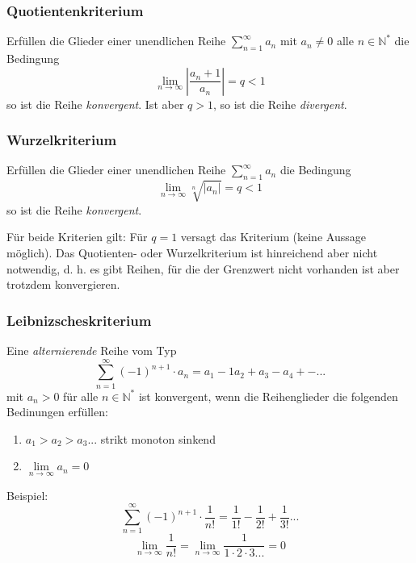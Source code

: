\subsubsection*{Quotientenkriterium}
\begin{definition}
Erfüllen die Glieder einer unendlichen Reihe $\sum\limits_{n=1}^{\infty} a_n $ mit $ a_n \neq 0 $ alle $ n \in \mathbb{N}^*$ die Bedingung 
\[
\lim_{n \rightarrow \infty} \left| \frac{a_n+1}{a_n} \right|= q < 1
\]
so ist die Reihe \textit{konvergent}. Ist aber $q>1$, so ist die Reihe \textit{divergent}. 
\end{definition}

\subsubsection*{Wurzelkriterium}
\begin{definition}
Erfüllen die Glieder einer unendlichen Reihe $\sum\limits_{n=1}^{\infty} a_n $ die Bedingung 
\[
 \lim_{n \rightarrow \infty} \sqrt[n]{|a_n|} = q < 1
\]
so ist die Reihe \textit{konvergent}. 
\end{definition}

Für beide Kriterien gilt: Für \(q = 1\) versagt das Kriterium (keine Aussage möglich). Das Quotienten- oder Wurzelkriterium ist hinreichend aber nicht notwendig, d. h. es gibt Reihen, für die der Grenzwert nicht vorhanden ist aber trotzdem konvergieren.

\subsubsection*{Leibnizscheskriterium}
\begin{definition}Eine \textit{alternierende} Reihe vom Typ
$$ \sum\limits_{n=1}^{\infty} (-1)^{n+1} \cdot a_n = a_1 -1 a_2 + a_3 - a_4 + - ...$$
mit $a_n > 0$ für alle $n \in \mathbb{N}^*$ ist konvergent, wenn die Reihenglieder die folgenden Bedinungen erfüllen:
\begin{enumerate}
	\item $a_1 > a_2 > a_3 ...$ strikt monoton sinkend
	\item $\lim\limits_{n \rightarrow \infty} a_n = 0$
\end{enumerate}
\end{definition}

Beispiel:
$$ \sum\limits_{n=1}^{\infty} (-1)^{n+1} \cdot \frac{1}{n!}  = \frac{1}{1!} - \frac{1}{2!} + \frac{1}{3!} ... $$ 
$$ \lim\limits_{n\rightarrow \infty} \frac{1}{n!} = \lim\limits_{n\rightarrow \infty} \frac{1}{1 \cdot 2 \cdot 3 ...} = 0$$

